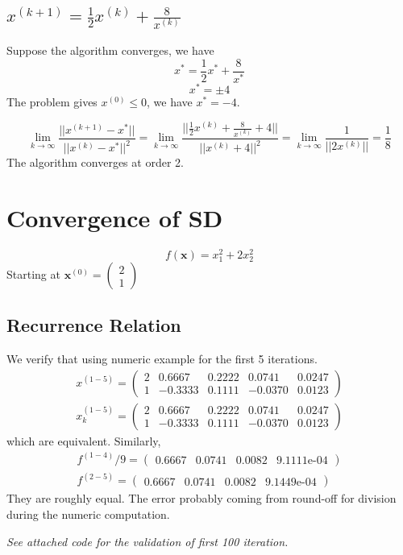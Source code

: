 \subsection{$x^{(k+1)} = \frac{1}{2}x^{(k)} + \frac{8}{x^{(k)}}$}
Suppose the algorithm converges, we have
\[
x^* = \frac{1}{2}x^* + \frac{8}{x^{*}}
\]
\[
x^* = \pm 4
\]
The problem gives $x^{(0)} \leq 0$, we have $x^* = -4$.

\[
\lim_{k \to \infty} \frac{||x^{(k+1)} - x^*||}{||x^{(k)} - x^*||^2} = 
\lim_{k \to \infty} \frac{||\frac{1}{2}x^{(k)} + \frac{8}{x^{(k)}} + 4||}{||x^{(k)} + 4||^2} = \lim_{k \to \infty} \frac{1}{||2x^{(k)}||} = \frac{1}{8}
\]
The algorithm converges at order 2.

\section{Convergence of SD}

\[
f(\bm x) = x_1^2 + 2x_2^2
\]
Starting at $\bm x^{(0)} =\begin{pmatrix}2 \\ 1\end{pmatrix}$
\subsection{Recurrence Relation}
We verify that using numeric example for the first 5 iterations.
\begin{gather*}
x^{(1-5)} = \left(\begin{array}{ccccc}
2 & 0.6667 & 0.2222 & 0.0741 & 0.0247\\
1 & -0.3333 & 0.1111 & -0.0370 & 0.0123
\end{array}\right) \\
x_k^{(1-5)} = \left(\begin{array}{ccccc}
2 & 0.6667 & 0.2222 & 0.0741 & 0.0247\\
1 & -0.3333 & 0.1111 & -0.0370 & 0.0123
\end{array}\right)
\end{gather*}
which are equivalent. Similarly, 
\begin{gather*}
f^{(1-4)} / 9 = \left(\begin{array}{cccc}
0.6667 & 0.0741 & 0.0082 & \text{9.1111e-04}
\end{array}\right)\\
f^{(2-5)} = \left(\begin{array}{cccc}
0.6667 & 0.0741 & 0.0082 & \text{9.1449e-04}
\end{array}\right)
\end{gather*}
They are roughly equal. The error probably coming from round-off for division during the numeric computation.
\par \textit{See attached code for the validation of first 100 iteration. }

